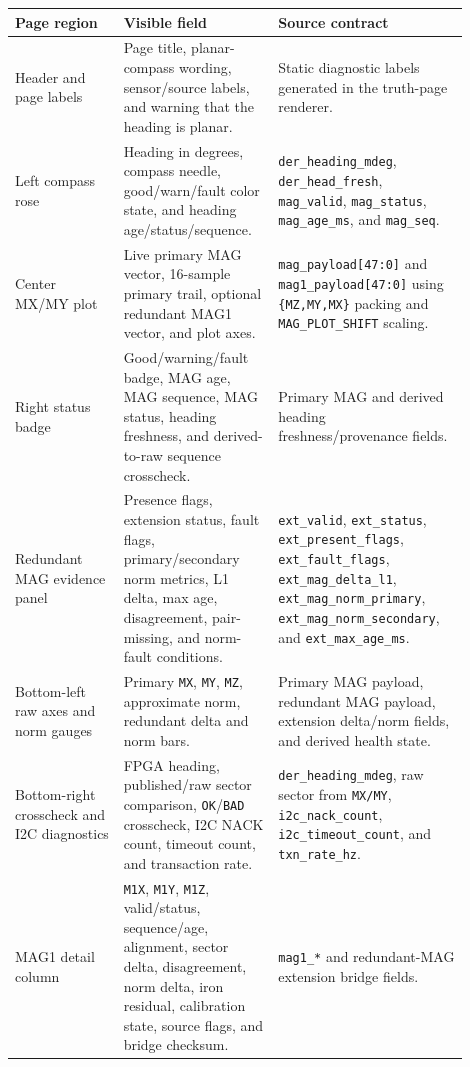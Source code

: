 \documentclass{article}
\newcommand{\sig}[1]{\begingroup\nolinkurl{#1}\endgroup}
\newcommand{\param}[1]{\begingroup\nolinkurl{#1}\endgroup}
\begin{document}
\begin{longtable}{p{0.22\linewidth} p{0.31\linewidth} p{0.37\linewidth}}
\toprule
\textbf{Page region} & \textbf{Visible field} & \textbf{Source contract} \\
\midrule
\endhead
Header and page labels &
Page title, planar-compass wording, sensor/source labels, and warning that the
heading is planar. &
Static diagnostic labels generated in the truth-page renderer. \\

Left compass rose &
Heading in degrees, compass needle, good/warn/fault color state, and heading
age/status/sequence. &
\sig{der_heading_mdeg}, \sig{der_head_fresh}, \sig{mag_valid},
\sig{mag_status}, \sig{mag_age_ms}, and \sig{mag_seq}. \\

Center MX/MY plot &
Live primary MAG vector, 16-sample primary trail, optional redundant MAG1
vector, and plot axes. &
\sig{mag_payload[47:0]} and \sig{mag1_payload[47:0]} using
\sig{\{MZ,MY,MX\}} packing and \param{MAG_PLOT_SHIFT} scaling. \\

Right status badge &
Good/warning/fault badge, MAG age, MAG sequence, MAG status, heading freshness,
and derived-to-raw sequence crosscheck. &
Primary MAG and derived heading freshness/provenance fields. \\

Redundant MAG evidence panel &
Presence flags, extension status, fault flags, primary/secondary norm metrics,
L1 delta, max age, disagreement, pair-missing, and norm-fault conditions. &
\sig{ext_valid}, \sig{ext_status}, \sig{ext_present_flags},
\sig{ext_fault_flags}, \sig{ext_mag_delta_l1}, \sig{ext_mag_norm_primary},
\sig{ext_mag_norm_secondary}, and \sig{ext_max_age_ms}. \\

Bottom-left raw axes and norm gauges &
Primary \sig{MX}, \sig{MY}, \sig{MZ}, approximate norm, redundant delta and norm
bars. &
Primary MAG payload, redundant MAG payload, extension delta/norm fields, and
derived health state. \\

Bottom-right crosscheck and I2C diagnostics &
FPGA heading, published/raw sector comparison, \sig{OK}/\sig{BAD} crosscheck,
I2C NACK count, timeout count, and transaction rate. &
\sig{der_heading_mdeg}, raw sector from \sig{MX/MY}, \sig{i2c_nack_count},
\sig{i2c_timeout_count}, and \sig{txn_rate_hz}. \\

MAG1 detail column &
\sig{M1X}, \sig{M1Y}, \sig{M1Z}, valid/status, sequence/age, alignment,
sector delta, disagreement, norm delta, iron residual, calibration state,
source flags, and bridge checksum. &
\sig{mag1_*} and redundant-MAG extension bridge fields. \\
\bottomrule
\end{longtable}
\end{document}
